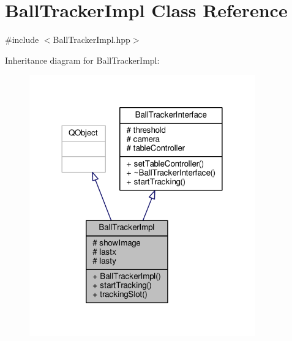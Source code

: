 \hypertarget{class_ball_tracker_impl}{}\section{Ball\+Tracker\+Impl Class Reference}
\label{class_ball_tracker_impl}


{\ttfamily \#include $<$Ball\+Tracker\+Impl.\+hpp$>$}



Inheritance diagram for Ball\+Tracker\+Impl\+:\nopagebreak
\begin{figure}[H]
\begin{center}
\leavevmode
\includegraphics[width=276pt]{class_ball_tracker_impl__inherit__graph}
\end{center}
\end{figure}


